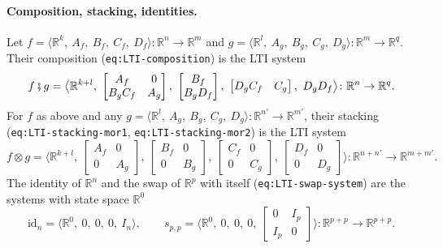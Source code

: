 \documentclass[11pt,a4paper]{article}
\theoremstyle{plain}
\theoremstyle{definition}
\theoremstyle{remark}
\newcommand{\R}{\mathbb{R}}
\newcommand{\id}{\mathrm{id}}
\newcommand{\then}{\mathbin{\fatsemi}}
\newcommand{\sys}[5]{\bigl\langle #1,\ #2,\ #3,\ #4,\ #5 \bigr\rangle}
\newcommand{\lbl}[1]{\nolinkurl{#1}}
\begin{document}
\paragraph{Composition, stacking, identities.}
Let $f = \sys{\R^{k}}{A_f}{B_f}{C_f}{D_f} \colon \R^n \to \R^m$ and $g = \sys{\R^{l}}{A_g}{B_g}{C_g}{D_g} \colon \R^m \to \R^q$.
Their composition (\lbl{eq:LTI-composition}) is the LTI system
\begin{equation}
    \label{eq:comp}
    f \then g = \sys{\R^{k+l}}
    {\begin{bmatrix} A_f & 0 \\ B_g C_f & A_g \end{bmatrix}}
    {\begin{bmatrix} B_f \\ B_g D_f \end{bmatrix}}
    {\begin{bmatrix} D_g C_f & C_g \end{bmatrix}}
    {D_g D_f}
    \colon \R^n \to \R^q .
\end{equation}
For $f$ as above and any $g = \sys{\R^{l}}{A_g}{B_g}{C_g}{D_g} \colon \R^{n'} \to \R^{m'}$, their stacking (\lbl{eq:LTI-stacking-mor1}, \lbl{eq:LTI-stacking-mor2}) is the LTI system
\begin{equation}
    \label{eq:stack}
    f \otimes g = \sys{\R^{k+l}}
    {\begin{bmatrix} A_f & 0 \\ 0 & A_g \end{bmatrix}}
    {\begin{bmatrix} B_f & 0 \\ 0 & B_g \end{bmatrix}}
    {\begin{bmatrix} C_f & 0 \\ 0 & C_g \end{bmatrix}}
    {\begin{bmatrix} D_f & 0 \\ 0 & D_g \end{bmatrix}}
    \colon \R^{n+n'} \to \R^{m+m'} .
\end{equation}
The identity of $\R^n$ and the swap of $\R^p$ with itself (\lbl{eq:LTI-swap-system}) are the systems with state space $\R^0$
\begin{equation}
    \label{eq:id-swap}
    \id_n = \sys{\R^0}{0}{0}{0}{I_n},
    \qquad
    s_{p,p} = \sys{\R^0}{0}{0}{0}{\begin{bmatrix} 0 & I_p \\ I_p & 0 \end{bmatrix}} \colon \R^{p+p} \to \R^{p+p} .
\end{equation}
\end{document}
